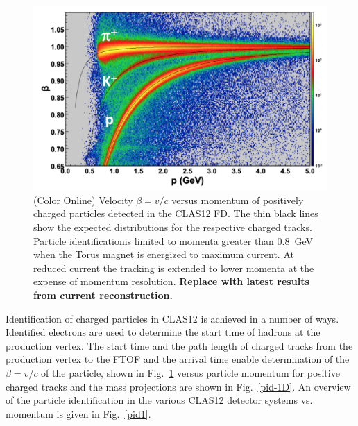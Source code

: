 \documentclass[final,3p,twocolumn]{elsarticle}
\begin{document}
\begin{figure}[htbp!]
\centerline{\includegraphics[width=1.1\columnwidth]{FTOF1b_pid.png}}
\caption{(Color Online) Velocity $\beta = v/c $ versus momentum of positively charged particles detected in the CLAS12 FD. The
thin black lines show the expected distributions for the respective charged tracks. Particle identificationis limited
to momenta greater than 0.8~GeV when the Torus magnet is energized to maximum current. At reduced current the
tracking is extended to lower momenta at the expense of momentum resolution. {\bf Replace with latest results
from current reconstruction.}}
\label{pid}
\end{figure} 

Identification of charged particles in CLAS12 is achieved in a number of ways. Identified electrons are used to
determine the start time of hadrons at the production vertex. The start time and the path length of charged tracks
from the production vertex to the FTOF and the arrival time enable determination of the $\beta = v/c$ of the
particle, shown in Fig.~\ref{pid} versus particle momentum for positive charged tracks and the mass projections are
shown in Fig.~\ref{pid-1D}.  An overview of the particle identification in the various CLAS12 detector systems vs.
momentum is given in Fig.~\ref{pid1}. 
\end{document}
